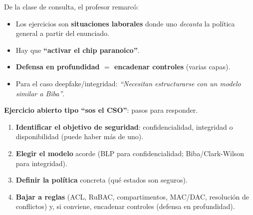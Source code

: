 \documentclass[../main.tex]{subfiles}
\begin{document}
\begin{destacado}
De la clase de consulta, el profesor remarcó:
\begin{itemize}[nosep]
  \item Los ejercicios son \textbf{situaciones laborales} donde uno \emph{decanta} la política general a partir del enunciado.
  \item Hay que \textbf{``activar el chip paranoico''}.
  \item \textbf{Defensa en profundidad $=$ encadenar controles} (varias capas).
  \item Para el caso deepfake/integridad: \emph{``Necesitan estructurarse con un modelo similar a Biba''}.
\end{itemize}
\end{destacado}

\begin{examen}
\textbf{Ejercicio abierto tipo ``sos el CSO''}: pasos para responder.
\begin{enumerate}[nosep]
  \item \textbf{Identificar el objetivo de seguridad}: confidencialidad, integridad o disponibilidad (puede haber más de uno).
  \item \textbf{Elegir el modelo} acorde (BLP para confidencialidad; Biba/Clark-Wilson para integridad).
  \item \textbf{Definir la política} concreta (qué estados son seguros).
  \item \textbf{Bajar a reglas} (ACL, RuBAC, compartimentos, MAC/DAC, resolución de conflictos) y, si conviene, encadenar controles (defensa en profundidad).
\end{enumerate}
\end{examen}
\end{document}
